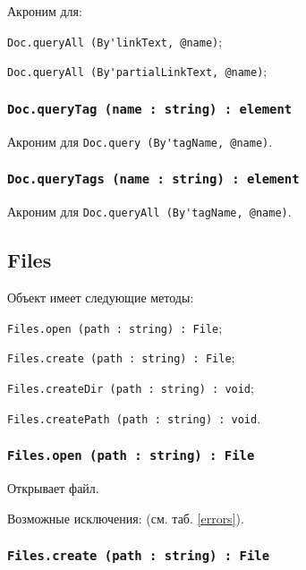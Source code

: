Акроним для:
\begin{icItems}
	\item \lstinline|Doc.queryAll (By'linkText, @name)|;
	\item \lstinline|Doc.queryAll (By'partialLinkText, @name)|;
\end{icItems}

\subsubsection{\lstinline|Doc.queryTag (name : string) : element|}

Акроним для \lstinline|Doc.query (By'tagName, @name)|.

\subsubsection{\lstinline|Doc.queryTags (name : string) : element|}

Акроним для \lstinline|Doc.queryAll (By'tagName, @name)|.

\subsection{{\color{orange} Files}}

Объект \files{} имеет следующие методы:
\begin{icItems}
	\item \lstinline|Files.open (path : string) : File|;
	\item \lstinline|Files.create (path : string) : File|;
	\item \lstinline|Files.createDir (path : string) : void|;
	\item \lstinline|Files.createPath (path : string) : void|.
\end{icItems}

\subsubsection{\lstinline|Files.open (path : string) : File|}

Открывает файл.

Возможные исключения:  (см. таб. \ref{errors}).

\subsubsection{\lstinline|Files.create (path : string) : File|}


